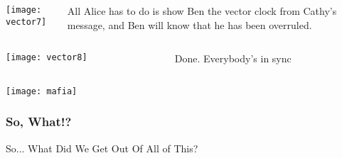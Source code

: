 \documentclass[aspectratio=169, 15pt,usenames,dvipsnames]{beamer}
\begin{document}
	\cprotEnv\begin{gdblank}
	\begin{columns}
		\begin{column}{0.5\textwidth}
			\texttt{[image: vector7]}			
		\end{column}
		\begin{column}{0.5\textwidth}				
			All Alice has to do is show Ben the vector clock from Cathy’s message, and Ben will know that he has been overruled.
		\end{column}	
	\end{columns} 
	\end{gdblank}
	\cprotEnv\begin{gdblank}
	\begin{columns}
		\begin{column}{0.5\textwidth}
			\texttt{[image: vector8]}			
		\end{column}
		\begin{column}{0.5\textwidth}				
			Done. Everybody's in sync
		\end{column}	
	\end{columns} 
	\end{gdblank}
	\begin{gdblank}		
		\centering
		\texttt{[image: mafia]}
	\end{gdblank}
	\begin{gdblank}
		\frametitle{So, What!?}
		\centering
		\large 
		So... What Did We Get Out Of All of This?
	\end{gdblank}	
\end{document}
